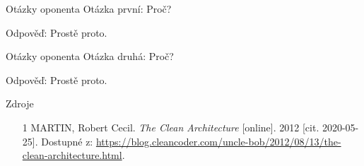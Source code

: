 \documentclass[czech,aspectratio=169]{beamer}
\begin{document}

\begin{frame}[noframenumbering]{Otázky oponenta}
    Otázka první: Proč?

    \vfill

    Odpověď: Prostě proto.
\end{frame}

\begin{frame}[noframenumbering]{Otázky oponenta}
    Otázka druhá: Proč?

    \vfill

    Odpověď: Prostě proto.
\end{frame}

\begin{frame}{Zdroje}
    \begin{itemize}
        \item [1] MARTIN, Robert Cecil. \emph{The Clean Architecture} [online]. 2012 [cit. 2020-05-25]. Dostupné z: \url{https://blog.cleancoder.com/uncle-bob/2012/08/13/the-clean-architecture.html}.
    \end{itemize}
\end{frame}
\end{document}
